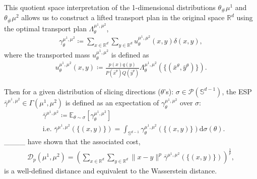 This quotient space interpretation of the 1-dimensional distributions $\theta_\#\mu^1$ and $\theta_\#\mu^2$ allows us to construct a lifted transport plan in the original space $\mathbb{R}^d$ using the optimal transport plan $\Lambda_\theta^{\mu^1, \mu^2}$,
\begin{align}
\label{eq: gamma_theta}
    \gamma_\theta^{\mu^1, \mu^2} \coloneqq \sum_{x\in\mathbb{R}^d}\sum_{y\in\mathbb{R}^d}u_\theta^{\mu^1, \mu^2}(x, y)\delta(x, y),
\end{align}
where the transported mass $u_\theta^{\mu^1, \mu^2}$ is defined as
\vspace{-.1in}
\begin{align}
    \label{eq: lifted theta}
    \nonumber u_\theta^{\mu^1, \mu^2}(x, y) \coloneqq
    \frac{p(x)q(y)}{P(\bar{x}^\theta)Q(\bar{y}^\theta)}\Lambda_\theta^{\mu^1, \mu^2}(\{(\bar{x}^\theta, \bar{y}^\theta)\}).
\end{align}


Then for a given distribution of slicing directions ($\theta$'s): $\sigma\in\mathcal{P}(\mathbb{S}^{d-1})$, the ESP $\bar{\gamma}^{\mu^1, \mu^2}\in\Gamma(\mu^1, \mu^2)$ is defined as an expectation of $\gamma_\theta^{\mu^1, \mu^2}$ over $\sigma$:
\begin{align}
    &\bar{\gamma}^{\mu^1, \mu^2} \coloneqq \mathbb{E}_{\theta\sim \sigma}[\gamma_\theta^{\mu^1, \mu^2}]\quad \\
    &\nonumber\text{i.e. }\bar{\gamma}^{\mu^1, \mu^2}(\{(x, y)\})=\int_{\mathbb{S}^{d-1}}\gamma_\theta^{\mu^1, \mu^2}(\{(x, y)\})\text{d}\sigma(\theta).
\end{align}
____ have shown that the associated cost, 
\begin{align*}
\mathcal{D}_p(\mu^1, \mu^2)=\left(\sum_{x\in\mathbb{R}^d}\sum_{y\in\mathbb{R}^d}\|x-y\|^p\bar{\gamma}^{\mu^1, \mu^2}(\{(x, y)\})\right)^\frac{1}{p},
\end{align*}
is a well-defined distance and equivalent to the Wasserstein distance.

